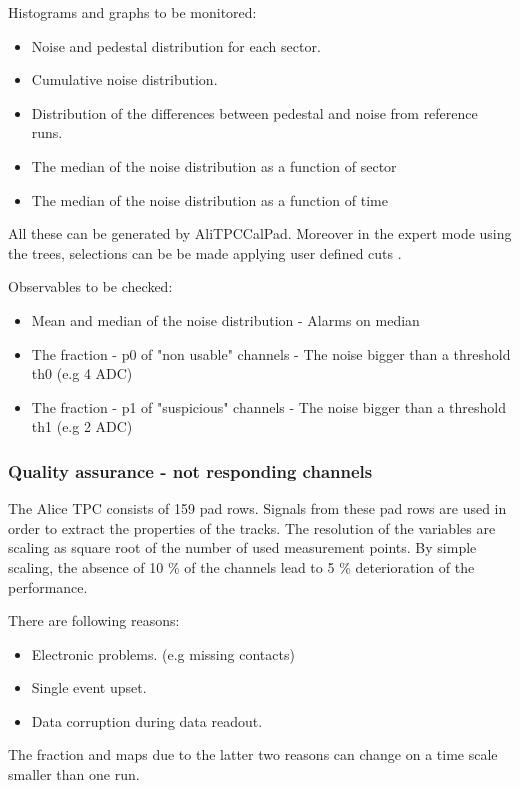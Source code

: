 \documentclass[a4paper,12pt]{article}
\begin{document}
Histograms and graphs to be monitored:
\begin{itemize}
 \item Noise and pedestal distribution for each sector.
 \item Cumulative noise distribution.
 \item Distribution of the differences between pedestal and noise from
      reference runs.
 \item The median of the noise distribution as a function of sector
 \item The median of the noise distribution as a function of time
\end{itemize}

All these can be generated by AliTPCCalPad. Moreover in the expert mode using
the trees, selections can be be made applying user defined cuts  .

Observables to be checked:
\begin{itemize}
 \item Mean and median of the noise distribution - Alarms on median
 \item The fraction - p0 of  "non usable" channels - The noise bigger
       than a threshold th0 (e.g 4 ADC)  
 \item The fraction - p1 of "suspicious" channels - The noise bigger than
       a threshold th1 (e.g 2 ADC)
\end{itemize}

\subsubsection{Quality  assurance  - not responding channels}

The Alice TPC consists of 159 pad rows.  Signals from these pad rows are used in
order to extract the properties of the tracks. The resolution of the variables
are scaling as square root of the number of used measurement points.  By simple
scaling, the absence of 10 \% of the channels lead to 5 \% deterioration of the 
performance.
  
There are following reasons:
\begin{itemize}
 \item Electronic problems. (e.g missing contacts)
 \item Single event upset. 
 \item Data corruption during data readout.
\end{itemize}

The fraction and maps due to the latter two reasons can change on a time scale
smaller than one run.
\end{document}
